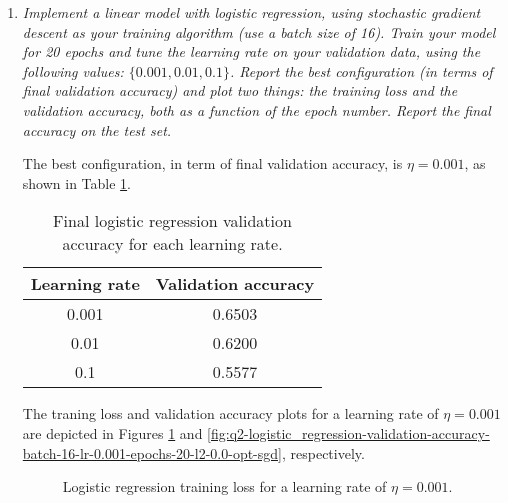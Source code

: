 \documentclass[12pt]{article}
\begin{document}
\begin{enumerate}[leftmargin=\labelsep]
    \item \textit{Implement a linear model with logistic regression, using stochastic gradient descent as your training algorithm (use a batch size of 16). Train your model for 20 epochs and tune the learning rate on your validation data, using the following values: $\{0.001, 0.01, 0.1\}$.  Report the best configuration (in terms of final validation accuracy) and plot two things: the training loss and the validation accuracy, both as a function of the epoch number. Report the final accuracy on the test set.}

          \vspace{12pt}

          The best configuration, in term of final validation accuracy, is $\eta = 0.001$, as shown in Table \ref{tab:logistic_regression-20}.

          \begin{table}[H]
              \centering
              \begin{tabular}{|c|c|}
                  \hline
                  Learning rate & Validation accuracy \\ \hline
                  0.001         & 0.6503              \\ \hline
                  0.01          & 0.6200              \\ \hline
                  0.1           & 0.5577              \\ \hline
              \end{tabular}
              \caption{Final logistic regression validation accuracy for each learning rate.}
              \label{tab:logistic_regression-20}
          \end{table}

          The traning loss and validation accuracy plots for a learning rate of $\eta = 0.001$ are depicted in Figures \ref{fig:q2-logistic_regression-training-loss-batch-16-lr-0.001-epochs-20-l2-0.0-opt-sgd} and \ref{fig:q2-logistic_regression-validation-accuracy-batch-16-lr-0.001-epochs-20-l2-0.0-opt-sgd}, respectively.

          \begin{figure}[H]
              \centering
              
              \caption{Logistic regression training loss for a learning rate of $\eta = 0.001$.}
              \label{fig:q2-logistic_regression-training-loss-batch-16-lr-0.001-epochs-20-l2-0.0-opt-sgd}
          \end{figure}


\end{enumerate}
\end{document}
